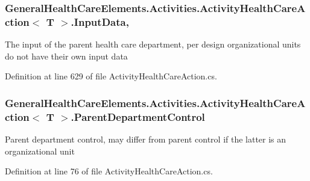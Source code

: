 \subsubsection[{\texorpdfstring{Input\+Data}{InputData}}]{ {\bf General\+Health\+Care\+Elements.\+Activities.\+Activity\+Health\+Care\+Action}$<$ T $>$.Input\+Data\hspace{0.3cm}{\ttfamily [get]}, {\ttfamily [set]}}\hypertarget{class_general_health_care_elements_1_1_activities_1_1_activity_health_care_action_a1a8170a5ed126df1094787aa84761da9}{}\label{class_general_health_care_elements_1_1_activities_1_1_activity_health_care_action_a1a8170a5ed126df1094787aa84761da9}


The input of the parent health care department, per design organizational units do not have their own input data 



Definition at line 629 of file Activity\+Health\+Care\+Action.\+cs.

\subsubsection[{\texorpdfstring{Parent\+Department\+Control}{ParentDepartmentControl}}]{ {\bf General\+Health\+Care\+Elements.\+Activities.\+Activity\+Health\+Care\+Action}$<$ T $>$.Parent\+Department\+Control\hspace{0.3cm}{\ttfamily [get]}}\hypertarget{class_general_health_care_elements_1_1_activities_1_1_activity_health_care_action_a430aeec9f142063191f8cac075d18fbc}{}\label{class_general_health_care_elements_1_1_activities_1_1_activity_health_care_action_a430aeec9f142063191f8cac075d18fbc}


Parent department control, may differ from parent control if the latter is an organizational unit 



Definition at line 76 of file Activity\+Health\+Care\+Action.\+cs.


